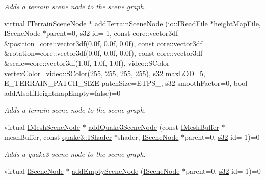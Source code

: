 \begin{DoxyCompactItemize}
\begin{DoxyCompactList}\small\item\em Adds a terrain scene node to the scene graph. \end{DoxyCompactList}\item 
virtual \hyperlink{classirr_1_1scene_1_1ITerrainSceneNode}{I\+Terrain\+Scene\+Node} $\ast$ \hyperlink{classirr_1_1scene_1_1ISceneManager_ae89a0a2d162a86f087eec66ddcd801b6}{add\+Terrain\+Scene\+Node} (\hyperlink{classirr_1_1io_1_1IReadFile}{io\+::\+I\+Read\+File} $\ast$height\+Map\+File, \hyperlink{classirr_1_1scene_1_1ISceneNode}{I\+Scene\+Node} $\ast$parent=0, \hyperlink{namespaceirr_ac66849b7a6ed16e30ebede579f9b47c6}{s32} id=-\/1, const \hyperlink{namespaceirr_1_1core_a06f169d08b5c429f5575acb7edbad811}{core\+::vector3df} \&position=\hyperlink{namespaceirr_1_1core_a06f169d08b5c429f5575acb7edbad811}{core\+::vector3df}(0.\+0f, 0.\+0f, 0.\+0f), const core\+::vector3df \&rotation=core\+::vector3df(0.\+0f, 0.\+0f, 0.\+0f), const core\+::vector3df \&scale=core\+::vector3df(1.\+0f, 1.\+0f, 1.\+0f), video\+::\+S\+Color vertex\+Color=video\+::\+S\+Color(255, 255, 255, 255), s32 max\+L\+O\+D=5, E\+\_\+\+T\+E\+R\+R\+A\+I\+N\+\_\+\+P\+A\+T\+C\+H\+\_\+\+S\+I\+Z\+E patch\+Size=\+E\+T\+P\+S\+\_, s32 smooth\+Factor=0, bool add\+Also\+If\+Heightmap\+Empty=false)=0
\begin{DoxyCompactList}\small\item\em Adds a terrain scene node to the scene graph. \end{DoxyCompactList}\item 
virtual \hyperlink{classirr_1_1scene_1_1IMeshSceneNode}{I\+Mesh\+Scene\+Node} $\ast$ \hyperlink{classirr_1_1scene_1_1ISceneManager_a58642d304110532988d27cebbe76ed41}{add\+Quake3\+Scene\+Node} (const \hyperlink{classirr_1_1scene_1_1IMeshBuffer}{I\+Mesh\+Buffer} $\ast$mesh\+Buffer, const \hyperlink{structirr_1_1scene_1_1quake3_1_1IShader}{quake3\+::\+I\+Shader} $\ast$shader, \hyperlink{classirr_1_1scene_1_1ISceneNode}{I\+Scene\+Node} $\ast$parent=0, \hyperlink{namespaceirr_ac66849b7a6ed16e30ebede579f9b47c6}{s32} id=-\/1)=0
\begin{DoxyCompactList}\small\item\em Adds a quake3 scene node to the scene graph. \end{DoxyCompactList}\item 
virtual \hyperlink{classirr_1_1scene_1_1ISceneNode}{I\+Scene\+Node} $\ast$ \hyperlink{classirr_1_1scene_1_1ISceneManager_a3811d3d2a092474e2c5613d550678187}{add\+Empty\+Scene\+Node} (\hyperlink{classirr_1_1scene_1_1ISceneNode}{I\+Scene\+Node} $\ast$parent=0, \hyperlink{namespaceirr_ac66849b7a6ed16e30ebede579f9b47c6}{s32} id=-\/1)=0

\end{DoxyCompactItemize}
